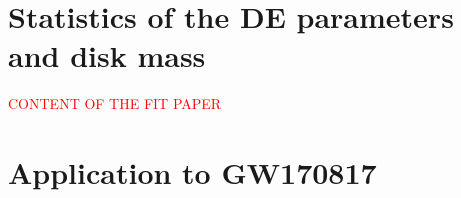 \documentclass[11pt,a4paper,headinclude=true,DIV=14,BCOR=8mm,chapterprefix,listof=totoc,twoside,openright,abstracton]{scrbook}
\newcommand{\red}[1]{\textcolor{red}{#1}}
\newcommand{\GW}{GW170817}
\begin{document}


\section{Statistics of the \ac{DE} parameters and disk mass}

\red{CONTENT OF THE FIT PAPER}


\section{Application to \GW{}}
\end{document}
